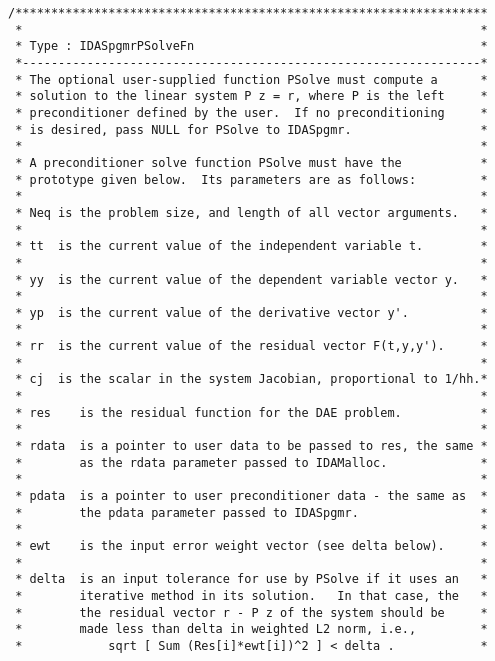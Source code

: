 \documentclass[11pt]{article}
\begin{document}
\begin{verbatim}
/******************************************************************
 *                                                                *           
 * Type : IDASpgmrPSolveFn                                        *
 *----------------------------------------------------------------*
 * The optional user-supplied function PSolve must compute a      *
 * solution to the linear system P z = r, where P is the left     *
 * preconditioner defined by the user.  If no preconditioning     *
 * is desired, pass NULL for PSolve to IDASpgmr.                  *
 *                                                                *
 * A preconditioner solve function PSolve must have the           *
 * prototype given below.  Its parameters are as follows:         *
 *                                                                *
 * Neq is the problem size, and length of all vector arguments.   *
 *                                                                *
 * tt  is the current value of the independent variable t.        *
 *                                                                *
 * yy  is the current value of the dependent variable vector y.   *
 *                                                                *
 * yp  is the current value of the derivative vector y'.          *
 *                                                                *
 * rr  is the current value of the residual vector F(t,y,y').     *
 *                                                                *
 * cj  is the scalar in the system Jacobian, proportional to 1/hh.*
 *                                                                *
 * res    is the residual function for the DAE problem.           *
 *                                                                *
 * rdata  is a pointer to user data to be passed to res, the same *
 *        as the rdata parameter passed to IDAMalloc.             *
 *                                                                *
 * pdata  is a pointer to user preconditioner data - the same as  *
 *        the pdata parameter passed to IDASpgmr.                 *
 *                                                                *
 * ewt    is the input error weight vector (see delta below).     *
 *                                                                *
 * delta  is an input tolerance for use by PSolve if it uses an   *
 *        iterative method in its solution.   In that case, the   *
 *        the residual vector r - P z of the system should be     *
 *        made less than delta in weighted L2 norm, i.e.,         *
 *            sqrt [ Sum (Res[i]*ewt[i])^2 ] < delta .            *

\end{verbatim}
\end{document}
